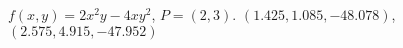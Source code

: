 {$f(x,y) = 2x^2y-4xy^2$,   $P=(2,3)$.\label{12_06_ex_13}
}
{
$(1.425, 1.085, -48.078)$, $(2.575, 4.915, -47.952)$
}